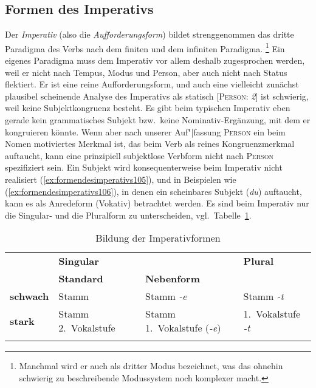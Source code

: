 \subsection{Formen des Imperativs}
\label{sec:formendesimperativs}


Der \textit{Imperativ} (also die \textit{Aufforderungsform}) bildet strenggenommen das dritte Paradigma des Verbs nach dem finiten und dem infiniten Paradigma.%
\footnote{Manchmal wird er auch als dritter Modus bezeichnet, was das ohnehin schwierig zu beschreibende Modussystem noch komplexer macht.}
Ein eigenes Paradigma muss dem Imperativ vor allem deshalb zugesprochen werden, weil er nicht nach Tempus, Modus und Person, aber auch nicht nach Status flektiert.
Er ist eine reine Aufforderungsform, und auch eine vielleicht zunächst plausibel scheinende Analyse des Imperativs als statisch [\textsc{Person}: \textit{2}] ist schwierig, weil keine Subjektkongruenz besteht.
Es gibt beim typischen Imperativ eben gerade kein grammatisches Subjekt bzw.\ keine Nominativ-Ergänzung, mit dem er kongruieren könnte.
Wenn aber nach unserer Auf"|fassung \textsc{Person} ein beim Nomen motiviertes Merkmal ist, das beim Verb als reines Kongruenzmerkmal auftaucht, kann eine prinzipiell subjektlose Verbform nicht nach \textsc{Person} spezifiziert sein.
Ein Subjekt wird konsequenterweise beim Imperativ nicht realisiert (\ref{ex:formendesimperativs105}), und in Beispielen wie (\ref{ex:formendesimperativs106}), in denen ein scheinbares Subjekt (\textit{du}) auftaucht, kann es als Anredeform (Vokativ) betrachtet werden.
Es sind beim Imperativ nur die Singular- und die Pluralform zu unterscheiden, vgl.\ Tabelle~\ref{tab:formendesimperativs107}.

\begin{exe}
  \ex\label{ex:formendesimperativs104}
  \begin{xlist}
  \end{xlist}
\end{exe}


\begin{table}[!htbp]
  \centering
  \begin{tabular}{llll}
    \lsptoprule
                     & \multicolumn{2}{l}{\textbf{Singular}}                   & \textbf{Plural}           \\
                     & \textbf{Standard}   & \textbf{Nebenform}                &                           \\
    \midrule
    \textbf{schwach} & Stamm               & Stamm \textit{-e}                 & Stamm \textit{-t}         \\
    \textbf{stark}   & Stamm 2.~Vokalstufe & Stamm 1.~Vokalstufe (\textit{-e}) & 1.~Vokalstufe \textit{-t} \\
    \lspbottomrule
  \end{tabular}
  \caption{Bildung der Imperativformen}
  \label{tab:formendesimperativs107}
\end{table}

